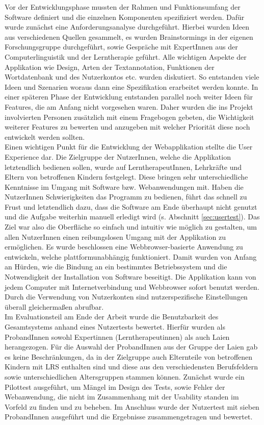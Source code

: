 Vor der Entwicklungsphase mussten der Rahmen und Funktionsumfang der Software definiert und die einzelnen Komponenten spezifiziert werden. Dafür wurde zunächst eine Anforderungsanalyse durchgeführt. Hierbei wurden Ideen aus verschiedenen Quellen gesammelt, es wurden Brainstormings in der eigenen Forschungsgruppe durchgeführt, sowie Gespräche mit ExpertInnen aus der Computerlinguistik und der Lerntherapie geführt. Alle wichtigen Aspekte der Applikation wie Design, Arten der Textannotation, Funktionen der Wortdatenbank und des Nutzerkontos etc. wurden diskutiert. So entstanden viele Ideen und Szenarien woraus dann eine Spezifikation erarbeitet werden konnte. In einer späteren Phase der Entwicklung entstanden parallel noch weiter Ideen für Features, die am Anfang nicht vorgesehen waren. Daher wurden die ins Projekt involvierten Personen zusätzlich mit einem Fragebogen gebeten, die Wichtigkeit weiterer Features zu bewerten und anzugeben mit welcher Priorität diese noch entwickelt werden sollten.\\
Einen wichtigen Punkt für die Entwicklung der Webapplikation stellte die User Experience dar. Die Zielgruppe der NutzerInnen, welche die Applikation letztendlich bedienen sollen, wurde auf LerntherapeutInnen, Lehrkräfte und Eltern von betroffenen Kindern festgelegt. Diese bringen sehr unterschiedliche Kenntnisse im Umgang mit Software bzw. Webanwendungen mit. Haben die NutzerInnen Schwierigkeiten das Programm zu bedienen, führt das schnell zu Frust und letztendlich dazu, dass die Software am Ende überhaupt nicht genutzt und die Aufgabe weiterhin manuell erledigt wird (s. Abschnitt \ref{sec:usertest}). Das Ziel war also die Oberfläche so einfach und intuitiv wie möglich zu gestalten, um allen NutzerInnen einen reibungslosen Umgang mit der Applikation zu ermöglichen. Es wurde beschlossen eine Webbrowser-basierte Anwendung zu entwickeln, welche plattformunabhängig funktioniert. Damit wurden von Anfang an Hürden, wie die Bindung an ein bestimmtes Betriebssystem und die Notwendigkeit der Installation von Software beseitigt. Die Applikation kann von jedem Computer mit Internetverbindung und Webbrowser sofort benutzt werden. Durch die Verwendung von Nutzerkonten sind nutzerspezifische Einstellungen überall gleichermaßen abrufbar.\\

Im Evaluationsteil am Ende der Arbeit wurde die Benutzbarkeit des Gesamtsystems anhand eines Nutzertests bewertet. Hierfür wurden als ProbandInnen sowohl Expertinnen (Lerntherapeutinnen) als auch Laien herangezogen. Für die Auswahl der ProbandInnen aus der Gruppe der Laien gab es keine Beschränkungen, da in der Zielgruppe auch Elternteile von betroffenen Kindern mit LRS enthalten sind und diese aus den verschiedensten Berufsfeldern sowie unterschiedlichen Altersgruppen stammen können. Zunächst wurde ein Pilottest ausgeführt, um Mängel im Design des Tests, sowie Fehler der Webanwendung, die nicht im Zusammenhang mit der Usability standen im Vorfeld zu finden und zu beheben. Im Anschluss wurde der Nutzertest mit sieben ProbandInnen ausgeführt und die Ergebnisse zusammengetragen und bewertet.\\

